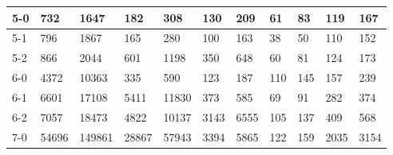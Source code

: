 \begin{table}[H]
\begin{tabular}{l|l|l|l|l|l|l|l|l|l|l|}
\multicolumn{1}{|l|}{5-0}   & 732        & 1647       & 182                                  & 308                                 & 130                                       & 209                                      & 61                                  & 83                                & 119                                 & 167                               \\ \hline
\multicolumn{1}{|l|}{5-1}   & 796        & 1867       & 165                                  & 280                                 & 100                                       & 163                                      & 38                                  & 50                                & 110                                 & 152                               \\ \hline
\multicolumn{1}{|l|}{5-2}   & 866        & 2044       & 601                                  & 1198                                & 350                                       & 648                                      & 60                                  & 81                                & 124                                 & 173                               \\ \hline
\multicolumn{1}{|l|}{6-0}   & 4372       & 10363      & 335                                  & 590                                 & 123                                       & 187                                      & 110                                 & 145                               & 157                                 & 239                               \\ \hline
\multicolumn{1}{|l|}{6-1}   & 6601       & 17108      & 5411                                 & 11830                               & 373                                       & 585                                      & 69                                  & 91                                & 282                                 & 374                               \\ \hline
\multicolumn{1}{|l|}{6-2}   & 7057       & 18473      & 4822                                 & 10137                               & 3143                                      & 6555                                     & 105                                 & 137                               & 409                                 & 568                               \\ \hline
\multicolumn{1}{|l|}{7-0}   & 54696      & 149861     & 28867                                & 57943                               & 3394                                      & 5865                                     & 122                                 & 159                               & 2035                                & 3154                              \\ \hline

\end{tabular}
\end{table}
